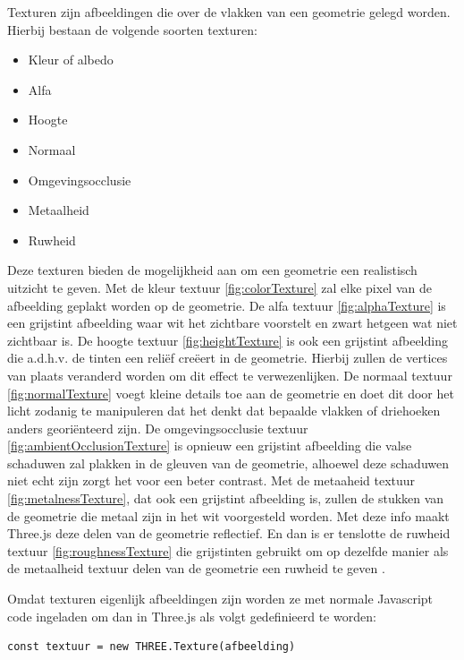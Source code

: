 Texturen zijn afbeeldingen die over de vlakken van een geometrie gelegd worden. Hierbij bestaan de volgende soorten texturen: 

\begin{itemize}
\item Kleur of albedo
\item Alfa
\item Hoogte
\item Normaal
\item Omgevingsocclusie
\item Metaalheid
\item Ruwheid
\end{itemize}

Deze texturen bieden de mogelijkheid aan om een geometrie een realistisch uitzicht te geven. Met de kleur textuur \ref{fig:colorTexture} zal elke pixel van de afbeelding geplakt worden op de geometrie. De alfa textuur \ref{fig:alphaTexture} is een grijstint afbeelding waar wit het zichtbare voorstelt en zwart hetgeen wat niet zichtbaar is. De hoogte textuur \ref{fig:heightTexture} is ook een grijstint afbeelding die a.d.h.v. de tinten een reliëf creëert in de geometrie. Hierbij zullen de vertices van plaats veranderd worden om dit effect te verwezenlijken. De normaal textuur \ref{fig:normalTexture} voegt kleine details toe aan de geometrie en doet dit door het licht zodanig te manipuleren dat het denkt dat bepaalde vlakken of driehoeken anders georiënteerd zijn. De omgevingsocclusie textuur \ref{fig:ambientOcclusionTexture} is opnieuw een grijstint afbeelding die valse schaduwen zal plakken in de gleuven van de geometrie, alhoewel deze schaduwen niet echt zijn zorgt het voor een beter contrast. Met de metaaheid textuur \ref{fig:metalnessTexture}, dat ook een grijstint afbeelding is, zullen de stukken van de geometrie die metaal zijn in het wit voorgesteld worden. Met deze info maakt Three.js deze delen van de geometrie reflectief. En dan is er tenslotte de ruwheid textuur \ref{fig:roughnessTexture} die grijstinten gebruikt om op dezelfde manier als de metaalheid textuur delen van de geometrie een ruwheid te geven \autocite{Simon2023}.

Omdat texturen eigenlijk afbeeldingen zijn worden ze met normale Javascript code ingeladen om dan in Three.js als volgt gedefinieerd te worden:

\begin{lstlisting}
const textuur = new THREE.Texture(afbeelding)
\end{lstlisting}

